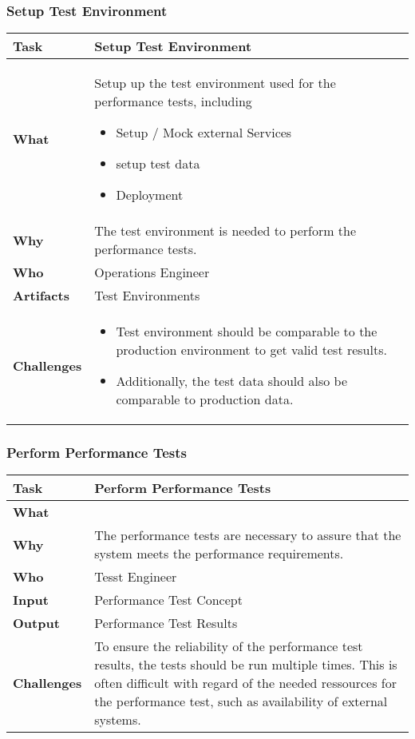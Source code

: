 \subsubsection{Setup Test Environment}
\begin{tabularx}{\textwidth}{@{} l X @{}}
	\caption{Setup Test Environment} \label{table:ch6_Task_Setup_Test_Environment}\\
	\toprule \bfseries Task & Setup Test Environment\\
	\midrule 
	\bfseries What & Setup up the test environment used for the performance tests, including
	\begin{itemize}
		\item Setup / Mock external Services
		\item setup test data
		\item Deployment
	\end{itemize}
	\\
	\midrule 
	\bfseries Why & The test environment is needed to perform the performance tests.\\
	\midrule 
	\bfseries Who & Operations Engineer\\
	\midrule 
	\bfseries Artifacts & Test Environments\\
	\midrule 
	\bfseries Challenges & 
	\begin{itemize}
		\item Test environment should be comparable to the production environment to get valid test results.
		\item Additionally, the test data should also be comparable to production data.
	\end{itemize}
	\\
	\bottomrule
\end{tabularx}


\subsubsection{Perform Performance Tests}
\begin{tabularx}{\textwidth}{@{} l X @{}}
	\caption{Perform Performance Tests} \label{table:ch6_Task_Perform_Performance_Tests}\\
	\toprule 
	\bfseries Task & Perform Performance Tests\\
	\midrule 
	\bfseries What & \\
	\midrule 
	\bfseries Why & The performance tests are necessary to assure that the system meets the performance requirements.\\
	\midrule 
	\bfseries Who & Tesst Engineer\\
	\midrule 
	\bfseries Input & Performance Test Concept\\
	\midrule 
	\bfseries Output & Performance Test Results\\
	\midrule 
	\bfseries Challenges & To ensure the reliability of the performance test results, the tests should be run multiple times. This is often difficult with regard of the needed ressources for the performance test, such as availability of external systems.\\
	\bottomrule 
\end{tabularx}

